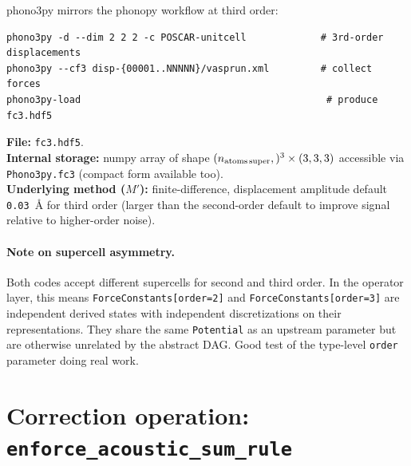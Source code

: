 \documentclass[11pt,a4paper]{article}
\begin{document}
\begin{phonobox}
phono3py mirrors the phonopy workflow at third order:
\begin{verbatim}
phono3py -d --dim 2 2 2 -c POSCAR-unitcell             # 3rd-order displacements
phono3py --cf3 disp-{00001..NNNNN}/vasprun.xml         # collect forces
phono3py-load                                           # produce fc3.hdf5
\end{verbatim}
\textbf{File:} \texttt{fc3.hdf5}.\\
\textbf{Internal storage:} numpy array of shape
$(n_{\text{atoms\,super}},)^3 \times (3,3,3)$ accessible via
\texttt{Phono3py.fc3} (compact form available too).\\
\textbf{Underlying method ($M'$):} finite-difference, displacement amplitude default
\texttt{0.03}~\AA{} for third order (larger than the second-order default to improve signal
relative to higher-order noise).
\end{phonobox}

\paragraph{Note on supercell asymmetry.} Both codes accept different supercells for second and
third order. In the operator layer, this means \texttt{ForceConstants[order=2]} and
\texttt{ForceConstants[order=3]} are independent derived states with independent
discretizations on their representations. They share the same \texttt{Potential} as an
upstream parameter but are otherwise unrelated by the abstract DAG. Good test of the
type-level \texttt{order} parameter doing real work.

\section{Correction operation: \texttt{enforce\_acoustic\_sum\_rule}}
\end{document}
